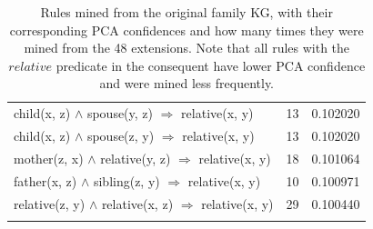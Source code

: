 \begin{longtable}{lrr}
     child(x, z) $\wedge$ spouse(y, z)   $\Rightarrow$ relative(x, y) &           13 &        0.102020 \\
     child(x, z) $\wedge$ spouse(z, y)   $\Rightarrow$ relative(x, y) &           13 &        0.102020 \\
  mother(z, x) $\wedge$ relative(y, z)   $\Rightarrow$ relative(x, y) &           18 &        0.101064 \\
   father(x, z) $\wedge$ sibling(z, y)   $\Rightarrow$ relative(x, y) &           10 &        0.100971 \\
relative(z, y) $\wedge$ relative(x, z)   $\Rightarrow$ relative(x, y) &           29 &        0.100440 \\
\bottomrule
\caption[Rules mined from the original family KG]{Rules mined from the original family KG, with their corresponding PCA confidences and how many times they were mined from the 48 extensions. Note that all rules with the $relative$ predicate in the consequent have lower PCA confidence and were mined less frequently.}
\label{family_original_rules_table_PCA}
\end{longtable}



